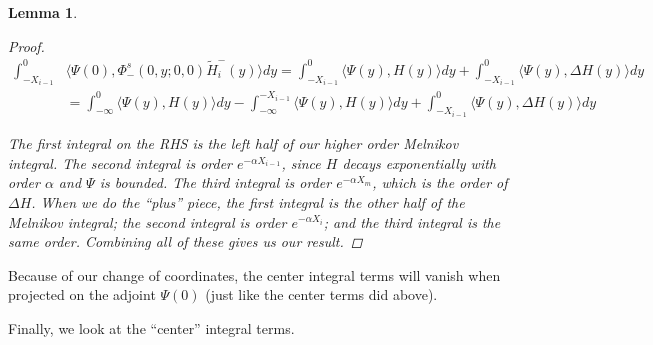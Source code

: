 \documentclass[12pt]{article}
\newtheorem{lemma}{Lemma}
\begin{document}
\begin{lemma}
\begin{proof}
\begin{align*}
\int_{-X_{i-1}}^0 &\langle \Psi(0), \Phi^s_-(0, y; 0, 0) \tilde{H}_i^-(y) \rangle dy = 
\int_{-X_{i-1}}^0 \langle \Psi(y), H(y) \rangle dy + \int_{-X_{i-1}}^0 \langle \Psi(y), \Delta H(y) \rangle dy \\
&= \int_{-\infty}^0 \langle \Psi(y), H(y) \rangle dy - \int_{-\infty}^{-X_{i-1}} \langle \Psi(y), H(y) \rangle dy + \int_{-X_{i-1}}^0 \langle \Psi(y), \Delta H(y) \rangle dy 
\end{align*}

The first integral on the RHS is the left half of our higher order Melnikov integral. The second integral is order $e^{-\alpha X_{i-1}}$, since $H$ decays exponentially with order $\alpha$ and $\Psi$ is bounded. The third integral is order $e^{-\alpha X_m}$, which is the order of $\Delta H$. When we do the ``plus'' piece, the first integral is the other half of the Melnikov integral; the second integral is order $e^{-\alpha X_i}$; and the third integral is the same order. Combining all of these gives us our result.

\end{proof}
\end{lemma}

Because of our change of coordinates, the center integral terms will vanish when projected on the adjoint $\Psi(0)$ (just like the center terms did above).

Finally, we look at the ``center'' integral terms.

\end{document}
